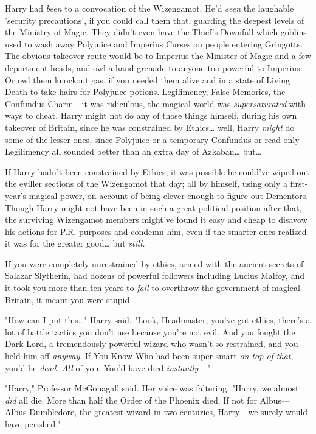 Harry had \emph{been} to a convocation of the Wizengamot. He'd \emph{seen} the 
laughable 'security precautions', if you could call them that, guarding the 
deepest levels of the Ministry of Magic. They didn't even have the Thief's 
Downfall which goblins used to wash away Polyjuice and Imperius Curses on 
people entering Gringotts. The obvious takeover route would be to Imperius the 
Minister of Magic and a few department heads, and owl a hand grenade to anyone 
too powerful to Imperius. Or owl them knockout gas, if you needed them alive 
and in a state of Living Death to take hairs for Polyjuice potions. 
Legilimency, False Memories, the Confundus Charm---it was ridiculous, the 
magical world was \emph{supersaturated} with ways to cheat. Harry might not do 
any of those things himself, during his own takeover of Britain, since he was 
constrained by Ethics{\ldots} well, Harry \emph{might} do some of the lesser 
ones, since Polyjuice or a temporary Confundus or read-only Legilimency all 
sounded better than an extra day of Azkaban{\ldots} but{\ldots}

If Harry hadn't been constrained by Ethics, it was possible he could've wiped 
out the eviller sections of the Wizengamot that day; all by himself, using only 
a first-year's magical power, on account of being clever enough to figure out 
Dementors. Though Harry might not have been in such a great political position 
after that, the surviving Wizengamot members might've found it easy and cheap 
to disavow his actions for P.R. purposes and condemn him, even if the smarter 
ones realized it was for the greater good{\ldots} but \emph{still.}

If you were completely unrestrained by ethics, armed with the ancient secrets 
of Salazar Slytherin, had dozens of powerful followers including Lucius Malfoy, 
and it took you more than ten years to \emph{fail} to overthrow the government 
of magical Britain, it meant you were stupid.

"How can I put this{\ldots}" Harry said. "Look, Headmaster, you've got ethics, 
there's a lot of battle tactics you don't use because you're not evil. And you 
fought the Dark Lord, a tremendously powerful wizard who wasn't so restrained, 
and you held him off \emph{anyway}. If You-Know-Who had been super-smart 
\emph{on top of that}, you'd be \emph{dead. All} of you. You'd have died 
\emph{instantly---}"

"Harry," Professor McGonagall said. Her voice was faltering. "Harry, we almost 
\emph{did} all die. More than half the Order of the Phoenix died. If not for 
Albus---Albus Dumbledore, the greatest wizard in two centuries, Harry---we 
surely would have perished."

